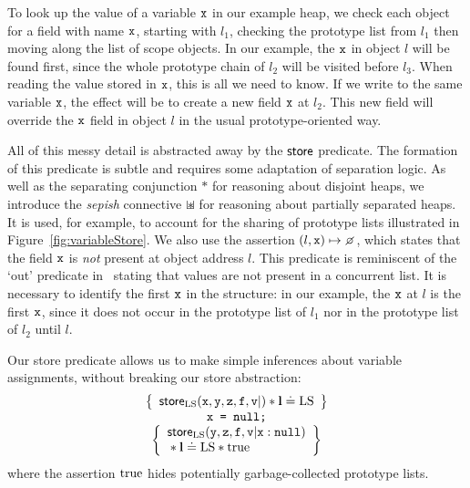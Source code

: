 \documentclass{article}
\begin{document}
To look up the value of a variable $\mbox{\texttt{{\upshape x}}}$ in our example heap, we check each object for
a field with  name $\mbox{\texttt{{\upshape x}}}$, starting with $l_1$, checking the prototype list from $l_1$ then moving along the list of scope objects. In our example, the $\mbox{\texttt{{\upshape x}}}$ in object $l$ will be found first, since the whole prototype chain of $l_2$ will be visited before $l_3$. 
When reading the value stored in $\mbox{\texttt{{\upshape x}}}$, this is all we need to know.
If we  write to the same variable $\mbox{\texttt{{\upshape x}}}$, the effect will be
to create a new field $\mbox{\texttt{{\upshape x}}}$ at $l_2$. This new field will override
the $\mbox{\texttt{{\upshape x}}}$ field in object $l$  in the usual prototype-oriented way.



All of this messy detail is abstracted away by the $\mathsf{store}$ predicate. The formation of this  predicate is subtle and requires some adaptation of separation logic. 
As well as  the separating conjunction $\ast$ for reasoning  about
disjoint heaps, we introduce the \emph{sepish} connective
$\mathbin{\sqcup\mkern-10mu*}$ for reasoning about partially separated heaps. It  is used, for example,  to account for  the sharing of prototype lists  illustrated in Figure~\ref{fig:variableStore}.
We also use  the assertion $(l,\js{x})\pointsto\none$, which states
that the field $\mbox{\texttt{{\upshape x}}}$ is {\em not} present at object address $l$. This predicate  is  reminiscent of the `out' predicate in~\cite{CAP}  stating  that values are not present in a concurrent list.
It  is necessary to identify the first $\mbox{\texttt{{\upshape x}}}$ in the structure: in our example, the $\mbox{\texttt{{\upshape x}}}$ at $l$ is the first $\mbox{\texttt{{\upshape x}}}$, since it does not occur in the prototype list of $l_1$ nor in the prototype list of $l_2$ until $l$.



Our store predicate allows us to make simple inferences  about variable assignments, without breaking our store abstraction: 
        \[\begin{array}{c}
                \left\{\begin{array}{l}
                        \mathsf{store}_{{\mathrm{LS}}}(\mbox{\texttt{{\upshape x}}},\mbox{\texttt{{\upshape y}}},\mbox{\texttt{{\upshape z}}},\mbox{\texttt{{\upshape f}}},\mbox{\texttt{{\upshape v}}}|) \mathbin{*}\textbf{l}\doteq{\ensuremath{\mathrm{LS}}}
                \end{array}\right\}\\
                \mbox{\texttt{{\upshape x = null;}}}\\
                \left\{\begin{array}{l}
                        \mathsf{store}_{{\mathrm{LS}}}(\mbox{\texttt{{\upshape y}}},\mbox{\texttt{{\upshape z}}},\mbox{\texttt{{\upshape f}}},\mbox{\texttt{{\upshape v}}}|\mbox{\texttt{{\upshape x}}}:\mbox{\texttt{{\upshape null}}}) \\
                        {}\mathbin{*}\textbf{l}\doteq{\ensuremath{\mathrm{LS}}}\mathbin{*} {\mathrm{true}}
                \end{array}\right\} \\
        \end{array}\]
where the assertion $ {\mathrm{true}}$ hides potentially garbage-collected prototype lists. 
\end{document}
